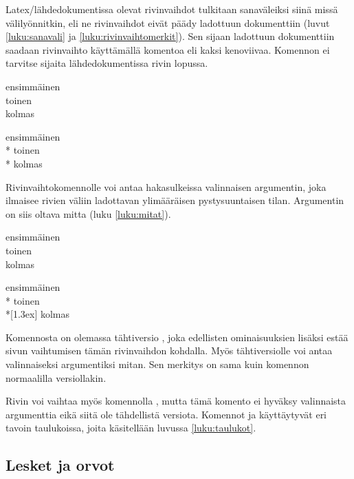 Latex\-/lähdedokumentissa olevat rivinvaihdot tulkitaan sanaväleiksi
siinä missä välilyönnitkin, eli ne rivinvaihdot eivät päädy ladottuun
dokumenttiin (luvut \ref{luku:sanavali} ja
\ref{luku:rivinvaihtomerkit}). Sen sijaan ladottuun dokumenttiin saadaan
rivinvaihto käyttämällä komentoa \komentom{\keno} eli kaksi kenoviivaa.
Komennon ei tarvitse sijaita lähdedokumentissa rivin lopussa.

\komentoi{\keno}
\begin{koodilohkosis}
ensimmäinen \\ toinen \\
kolmas
\end{koodilohkosis}

\begin{tulossis}
  ensimmäinen \\* toinen \\* kolmas
\end{tulossis}

Rivinvaihtokomennolle voi antaa hakasulkeissa valinnaisen argumentin,
joka ilmaisee rivien väliin ladottavan ylimääräisen pystysuuntaisen
tilan. Argumentin on siis oltava mitta (luku \ref{luku:mitat}).

\komentoi{\keno}
\begin{koodilohkosis}
ensimmäinen \\ toinen \\[1.3ex] kolmas
\end{koodilohkosis}

\begin{tulossis}
  ensimmäinen \\* toinen \\*[1.3ex] kolmas
\end{tulossis}

Komennosta on olemassa tähtiversio \komentom{\keno *}, joka edellisten
ominaisuuksien lisäksi estää sivun vaihtumisen tämän rivinvaihdon
kohdalla. Myös tähtiversiolle voi antaa valinnaiseksi argumentiksi
mitan. Sen merkitys on sama kuin komennon normaalilla versiollakin.

Rivin voi vaihtaa myös komennolla , mutta tämä komento
ei hyväksy valinnaista argumenttia eikä siitä ole tähdellistä versiota.
Komennot  ja \komento{\keno} käyttäytyvät eri tavoin
taulukoissa, joita käsitellään luvussa \ref{luku:taulukot}.

\subsection{Lesket ja orvot}

